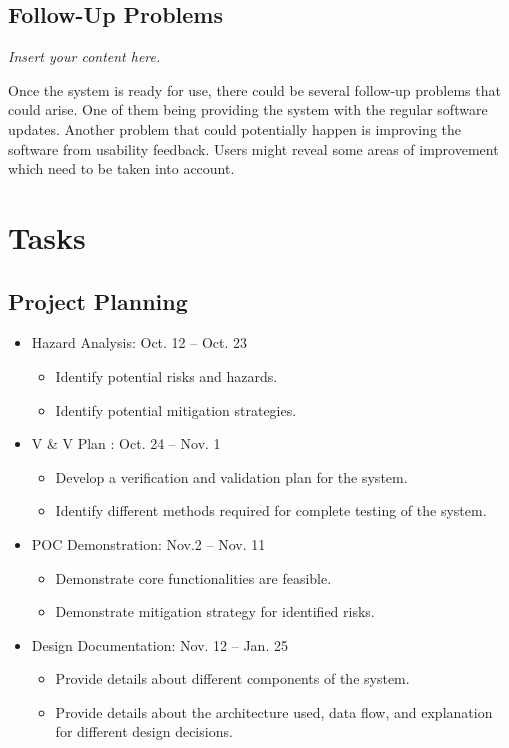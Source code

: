 \documentclass[12pt]{article}
\newcommand{\lips}{\textit{Insert your content here.}}
\begin{document}
\begin{itemize}
\subsection{Follow-Up Problems}
\lips

Once the system is ready for use, there could be several follow-up problems that could arise. One of them being providing the system with the regular software updates. Another problem that could potentially happen is improving the software from usability feedback. Users might reveal some areas of improvement which need to be taken into account.

\section{Tasks}
\subsection{Project Planning}

\begin{itemize}
  \item Hazard Analysis: Oct. 12 -- Oct. 23  
  \begin{itemize}
    \item Identify potential risks and hazards.
    \item Identify potential mitigation strategies.
  \end{itemize}

  \item V & V Plan : Oct. 24 -- Nov. 1  
  \begin{itemize}
    \item Develop a verification and validation plan for the system.
    \item Identify different methods required for complete testing of the system.
  \end{itemize}

  \item POC Demonstration: Nov.2  -- Nov. 11  
  \begin{itemize}
    \item Demonstrate core functionalities are feasible.
    \item Demonstrate mitigation strategy for identified risks.
  \end{itemize}

  \item Design Documentation: Nov. 12 -- Jan. 25 
  \begin{itemize}
    \item Provide details about different components of the system.
    \item Provide details about the architecture used, data flow, and explanation for different design decisions.
  \end{itemize}


\end{itemize}
\end{itemize}
\end{document}

